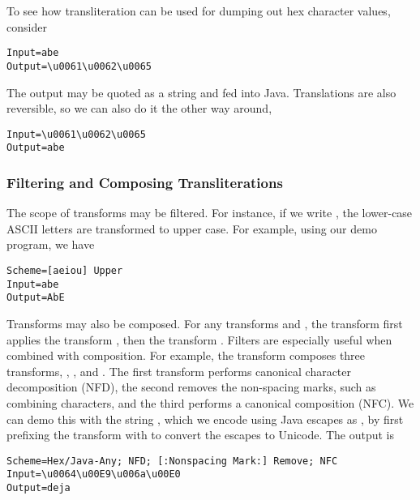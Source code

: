 To see how transliteration can be used for dumping out
hex character values, consider
%
\begin{verbatim}
Input=abe
Output=\u0061\u0062\u0065
\end{verbatim}
%
The output may be quoted as a string and fed into Java.  Translations
are also reversible, so we can also do it the other way around,
%
\begin{verbatim}
Input=\u0061\u0062\u0065
Output=abe
\end{verbatim}

\subsubsection{Filtering and Composing Transliterations}

The scope of transforms may be filtered. For instance, if we write
, the lower-case ASCII letters are transformed
to upper case.  For example,
using our demo program, we have
%
\begin{verbatim}
Scheme=[aeiou] Upper
Input=abe
Output=AbE
\end{verbatim}
%

Transforms may also be composed.  For any transforms  
and , the transform  first applies the transform
, then the transform .  
Filters are especially useful when combined with composition.  For
example, the transform
composes three transforms, , , and .  The first transform performs canonical
character decomposition (NFD), the second removes the non-spacing
marks, such as combining characters, and the third performs a
canonical composition (NFC).  We can demo this with the string
, which we encode using Java escapes as
, by first prefixing
the transform with \code{Hex/Java-Any} to convert the escapes to Unicode.
The output is
%
\begin{verbatim}
Scheme=Hex/Java-Any; NFD; [:Nonspacing Mark:] Remove; NFC
Input=\u0064\u00E9\u006a\u00E0
Output=deja
\end{verbatim}







